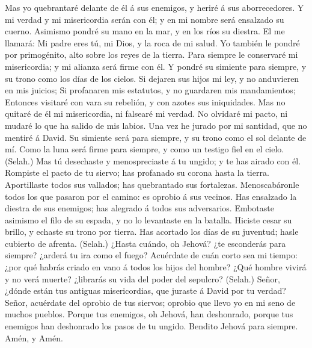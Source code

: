 Mas yo quebrantaré delante de él á sus enemigos, y heriré á sus
aborrecedores.  Y mi verdad y mi misericordia serán con
él; y en mi nombre será ensalzado su cuerno.  Asimismo
pondré su mano en la mar, y en los ríos su diestra.  El
me llamará: Mi padre eres tú, mi Dios, y la roca de mi salud.
 Yo también le pondré por primogénito, alto sobre los
reyes de la tierra.  Para siempre le conservaré mi
misericordia; y mi alianza será firme con él.  Y pondré
su simiente para siempre, y su trono como los días de los cielos.
 Si dejaren sus hijos mi ley, y no anduvieren en mis
juicios;  Si profanaren mis estatutos, y no guardaren mis
mandamientos;  Entonces visitaré con vara su rebelión, y
con azotes sus iniquidades.  Mas no quitaré de él mi
misericordia, ni falsearé mi verdad.  No olvidaré mi
pacto, ni mudaré lo que ha salido de mis labios.  Una vez
he jurado por mi santidad, que no mentiré á David.  Su
simiente será para siempre, y su trono como el sol delante de mí.
 Como la luna será firme para siempre, y como un testigo
fiel en el cielo. (Selah.)  Mas tú desechaste y
menospreciaste á tu ungido; y te has airado con él. 
Rompiste el pacto de tu siervo; has profanado su corona hasta la tierra.
 Aportillaste todos sus vallados; has quebrantado sus
fortalezas.  Menoscabáronle todos los que pasaron por el
camino: es oprobio á sus vecinos.  Has ensalzado la
diestra de sus enemigos; has alegrado á todos sus adversarios.
 Embotaste asimismo el filo de su espada, y no lo
levantaste en la batalla.  Hiciste cesar su brillo, y
echaste su trono por tierra.  Has acortado los días de su
juventud; hasle cubierto de afrenta. (Selah.)  ¿Hasta
cuándo, oh Jehová? ¿te esconderás para siempre? ¿arderá tu ira como el
fuego?  Acuérdate de cuán corto sea mi tiempo: ¿por qué
habrás criado en vano á todos los hijos del hombre?  ¿Qué
hombre vivirá y no verá muerte? ¿librarás su vida del poder del
sepulcro? (Selah.)  Señor, ¿dónde están tus antiguas
misericordias, que juraste á David por tu verdad?  Señor,
acuérdate del oprobio de tus siervos; oprobio que llevo yo en mi seno de
muchos pueblos.  Porque tus enemigos, oh Jehová, han
deshonrado, porque tus enemigos han deshonrado los pasos de tu ungido.
 Bendito Jehová para siempre. Amén, y Amén.

